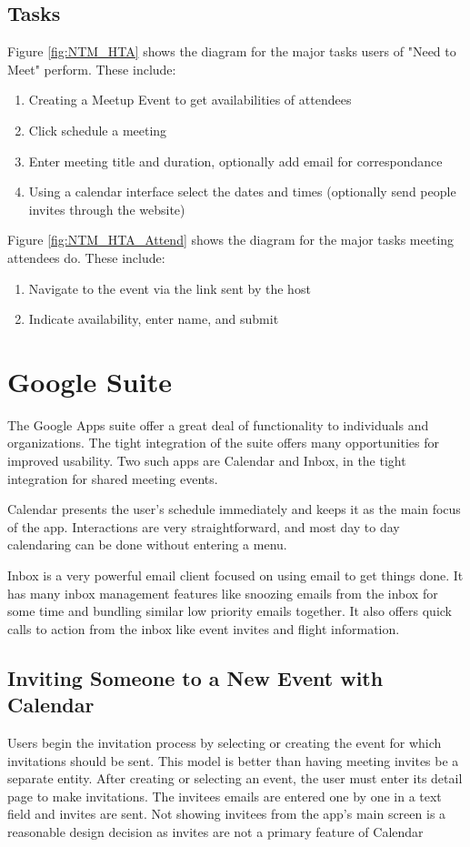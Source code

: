 \documentclass{sigchi}
\begin{document}
\subsection{Tasks}
Figure \ref{fig:NTM_HTA} shows the diagram for the major tasks users of "Need to Meet" perform. These include: 
\begin{enumerate}
\item Creating a Meetup Event to get availabilities of attendees
\item Click schedule a meeting
\item Enter meeting title and duration, optionally add email for correspondance
\item Using a calendar interface select the dates and times (optionally 
send people invites through the website)
\end{enumerate}
Figure \ref{fig:NTM_HTA_Attend} shows the diagram for the major tasks meeting attendees do. These include: 
\begin{enumerate}
\item Navigate to the event via the link sent by the host
\item Indicate availability, enter name, and submit
\end{enumerate}

\section{Google Suite}
The Google Apps suite offer a great deal of functionality to individuals and organizations.
The tight integration of the suite offers many opportunities for improved usability.
Two such apps are Calendar and Inbox, in the tight integration for shared meeting events. 

Calendar presents the user's schedule immediately and keeps it as the main focus of the app.
Interactions are very straightforward, and most day to day calendaring can be done without entering a menu.

Inbox is a very powerful email client focused on using email to get things done.
It has many inbox management features like snoozing emails from the inbox for some time and bundling similar low priority emails together.
It also offers quick calls to action from the inbox like event invites and flight information.

\subsection{Inviting Someone to a New Event with Calendar}
Users begin the invitation process by selecting or creating the event for which invitations should be sent.
This model is better than having meeting invites be a separate entity.
After creating or selecting an event, the user must enter its detail page to make invitations.
The invitees emails are entered one by one in a text field and invites are sent.
Not showing invitees from the app's main screen is a reasonable design decision as invites are not a primary feature of Calendar
\end{document}
